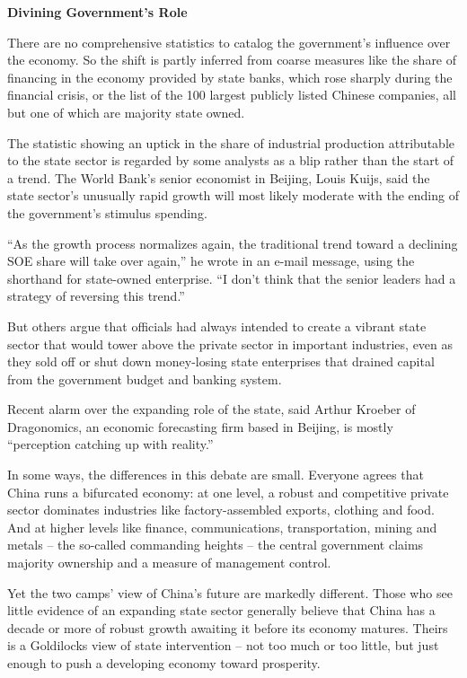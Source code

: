 ﻿\documentclass[12pt]{article}
\begin{document}
\textbf{Divining Government's Role}

There are no comprehensive statistics to catalog the government's influence over the economy. So the
shift is partly inferred from coarse measures like the share of financing in the economy provided by
state banks, which rose sharply during the financial crisis, or the list of the 100 largest publicly
listed Chinese companies, all but one of which are majority state owned.

The statistic showing an uptick in the share of industrial production attributable to the state
sector is regarded by some analysts as a blip rather than the start of a trend. The World Bank's
senior economist in Beijing, Louis Kuijs, said the state sector's unusually rapid growth will most
likely moderate with the ending of the government's stimulus spending.

``As the growth process normalizes again, the traditional trend toward a declining SOE share will
take over again,'' he wrote in an e-mail message, using the shorthand for state-owned enterprise.
``I don't think that the senior leaders had a strategy of reversing this trend.''

But others argue that officials had always intended to create a vibrant state sector that would
tower above the private sector in important industries, even as they sold off or shut down
money-losing state enterprises that drained capital from the government budget and banking system.

Recent alarm over the expanding role of the state, said Arthur Kroeber of Dragonomics, an economic
forecasting firm based in Beijing, is mostly ``perception catching up with reality.''

In some ways, the differences in this debate are small. Everyone agrees that China runs a bifurcated
economy: at one level, a robust and competitive private sector dominates industries like
factory-assembled exports, clothing and food. And at higher levels like finance, communications,
transportation, mining and metals -- the so-called commanding heights -- the central government
claims majority ownership and a measure of management control.

Yet the two camps' view of China's future are markedly different. Those who see little evidence of
an expanding state sector generally believe that China has a decade or more of robust growth
awaiting it before its economy matures. Theirs is a Goldilocks view of state intervention -- not too
much or too little, but just enough to push a developing economy toward prosperity.
\end{document}
